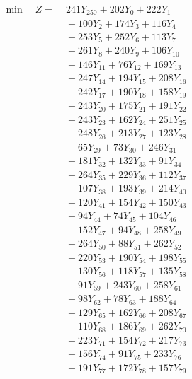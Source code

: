\documentclass[a4paper,10pt]{article}
\begin{document}
\allowdisplaybreaks
{\small
\begin{align}
\min \quad Z = &\; 241 Y_{250} + 202 Y_{0} + 222 Y_{1} \\[0.3ex]
&\;  + 100 Y_{2} + 174 Y_{3} + 116 Y_{4} \\[0.3ex]
&\;  + 253 Y_{5} + 252 Y_{6} + 113 Y_{7} \\[0.3ex]
&\;  + 261 Y_{8} + 240 Y_{9} + 106 Y_{10} \\[0.3ex]
&\;  + 146 Y_{11} + 76 Y_{12} + 169 Y_{13} \\[0.3ex]
&\;  + 247 Y_{14} + 194 Y_{15} + 208 Y_{16} \\[0.3ex]
&\;  + 242 Y_{17} + 190 Y_{18} + 158 Y_{19} \\[0.3ex]
&\;  + 243 Y_{20} + 175 Y_{21} + 191 Y_{22} \\[0.3ex]
&\;  + 243 Y_{23} + 162 Y_{24} + 251 Y_{25} \\[0.3ex]
&\;  + 248 Y_{26} + 213 Y_{27} + 123 Y_{28} \\[0.5ex]\allowbreak
&\;  + 65 Y_{29} + 73 Y_{30} + 246 Y_{31} \\[0.3ex]
&\;  + 181 Y_{32} + 132 Y_{33} + 91 Y_{34} \\[0.3ex]
&\;  + 264 Y_{35} + 229 Y_{36} + 112 Y_{37} \\[0.3ex]
&\;  + 107 Y_{38} + 193 Y_{39} + 214 Y_{40} \\[0.3ex]
&\;  + 120 Y_{41} + 154 Y_{42} + 150 Y_{43} \\[0.3ex]
&\;  + 94 Y_{44} + 74 Y_{45} + 104 Y_{46} \\[0.3ex]
&\;  + 152 Y_{47} + 94 Y_{48} + 258 Y_{49} \\[0.3ex]
&\;  + 264 Y_{50} + 88 Y_{51} + 262 Y_{52} \\[0.3ex]
&\;  + 220 Y_{53} + 190 Y_{54} + 198 Y_{55} \\[0.3ex]
&\;  + 130 Y_{56} + 118 Y_{57} + 135 Y_{58} \\[0.5ex]\allowbreak
&\;  + 91 Y_{59} + 243 Y_{60} + 258 Y_{61} \\[0.3ex]
&\;  + 98 Y_{62} + 78 Y_{63} + 188 Y_{64} \\[0.3ex]
&\;  + 129 Y_{65} + 162 Y_{66} + 208 Y_{67} \\[0.3ex]
&\;  + 110 Y_{68} + 186 Y_{69} + 262 Y_{70} \\[0.3ex]
&\;  + 223 Y_{71} + 154 Y_{72} + 217 Y_{73} \\[0.3ex]
&\;  + 156 Y_{74} + 91 Y_{75} + 233 Y_{76} \\[0.3ex]
&\;  + 191 Y_{77} + 172 Y_{78} + 157 Y_{79} \\[0.3ex]

\end{align}}
\end{document}
